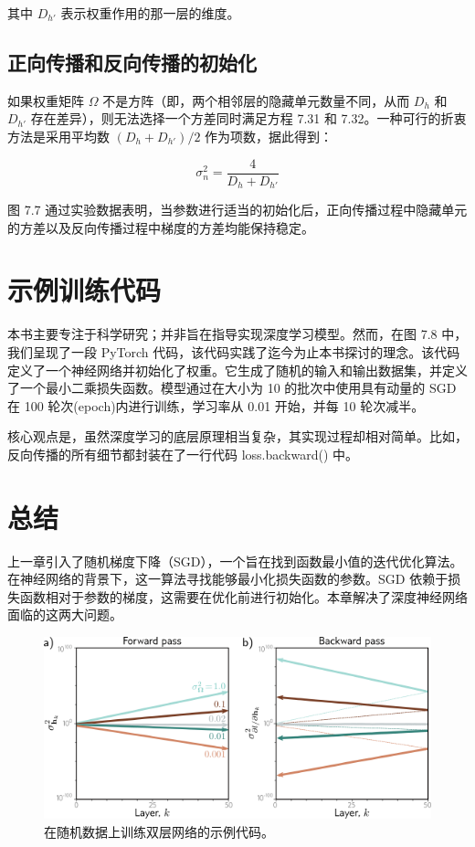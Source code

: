 其中 \(D_{h'}\) 表示权重作用的那一层的维度。
\subsection{正向传播和反向传播的初始化}
如果权重矩阵 \( \Omega \) 不是方阵（即，两个相邻层的隐藏单元数量不同，从而 \( D_h \) 和 \( D_{h'} \) 存在差异），则无法选择一个方差同时满足方程 7.31 和 7.32。一种可行的折衷方法是采用平均数 \( (D_h + D_{h'})/2 \) 作为项数，据此得到：

\begin{equation}
\sigma^2_n = \frac{4}{D_h + D_{h'}} 
\end{equation}

图 7.7 通过实验数据表明，当参数进行适当的初始化后，正向传播过程中隐藏单元的方差以及反向传播过程中梯度的方差均能保持稳定。

\section{示例训练代码}
本书主要专注于科学研究；并非旨在指导实现深度学习模型。然而，在图 7.8 中，我们呈现了一段 PyTorch 代码，该代码实践了迄今为止本书探讨的理念。该代码定义了一个神经网络并初始化了权重。它生成了随机的输入和输出数据集，并定义了一个最小二乘损失函数。模型通过在大小为 10 的批次中使用具有动量的 SGD 在 100 轮次(epoch)内进行训练，学习率从 0.01 开始，并每 10 轮次减半。

核心观点是，虽然深度学习的底层原理相当复杂，其实现过程却相对简单。比如，反向传播的所有细节都封装在了一行代码 loss.backward()  中。

\section{总结}
上一章引入了随机梯度下降（SGD），一个旨在找到函数最小值的迭代优化算法。在神经网络的背景下，这一算法寻找能够最小化损失函数的参数。SGD 依赖于损失函数相对于参数的梯度，这需要在优化前进行初始化。本章解决了深度神经网络面临的这两大问题。

\begin{figure}[ht!]
\centering
\includegraphics[width=0.7\linewidth]{png/chapter7/Train2Exploding.png}
\caption{在随机数据上训练双层网络的示例代码。}
\end{figure}

